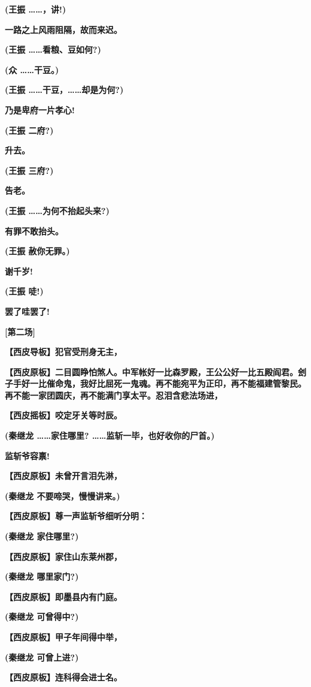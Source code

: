 \textbf{(王振 \ldots{}\ldots{}，讲!)}

\textbf{一路之上风雨阻隔，故而来迟。}

\textbf{(王振 \ldots{}\ldots{}看粮、豆如何?)}

\textbf{(众 \ldots{}\ldots{}干豆。)}

\textbf{(王振 \ldots{}\ldots{}干豆，\ldots{}\ldots{}却是为何?)}

\textbf{乃是卑府一片孝心!}

\textbf{(王振 二府?)}

\textbf{升去。}

\textbf{(王振 三府?)}

\textbf{告老。}

\textbf{(王振 \ldots{}\ldots{}为何不抬起头来?)}

\textbf{有罪不敢抬头。}

\textbf{(王振 赦你无罪。)}

\textbf{谢千岁!}

\textbf{(王振 唗!)}

\textbf{罢了哇罢了!}

\textbf{{[}第二场{]}}

\textbf{【西皮导板】犯官受刑身无主，}

\textbf{【西皮原板】二目圆睁怕煞人。中军帐好一比森罗殿，王公公好一比五殿阎君。刽子手好一比催命鬼，我好比屈死一鬼魂。再不能宛平为正印，再不能福建管黎民。再不能一家团圆庆，再不能满门享太平。忍泪含悲法场进，}

\textbf{【西皮摇板】咬定牙关等时辰。}

\textbf{(秦继龙 \ldots{}\ldots{}家住哪里?
\ldots{}\ldots{}监斩一毕，也好收你的尸首。)}

\textbf{监斩爷容禀!}

\textbf{【西皮原板】未曾开言泪先淋，}

\textbf{(秦继龙 不要啼哭，慢慢讲来。)}

\textbf{【西皮原板】尊一声监斩爷细听分明：}

\textbf{(秦继龙 家住哪里?)}

\textbf{【西皮原板】家住山东莱州郡，}

\textbf{(秦继龙 哪里家门?)}

\textbf{【西皮原板】即墨县内有门庭。}

\textbf{(秦继龙 可曾得中?)}

\textbf{【西皮原板】甲子年间得中举，}

\textbf{(秦继龙 可曾上进?)}

\textbf{【西皮原板】连科得会进士名。}

